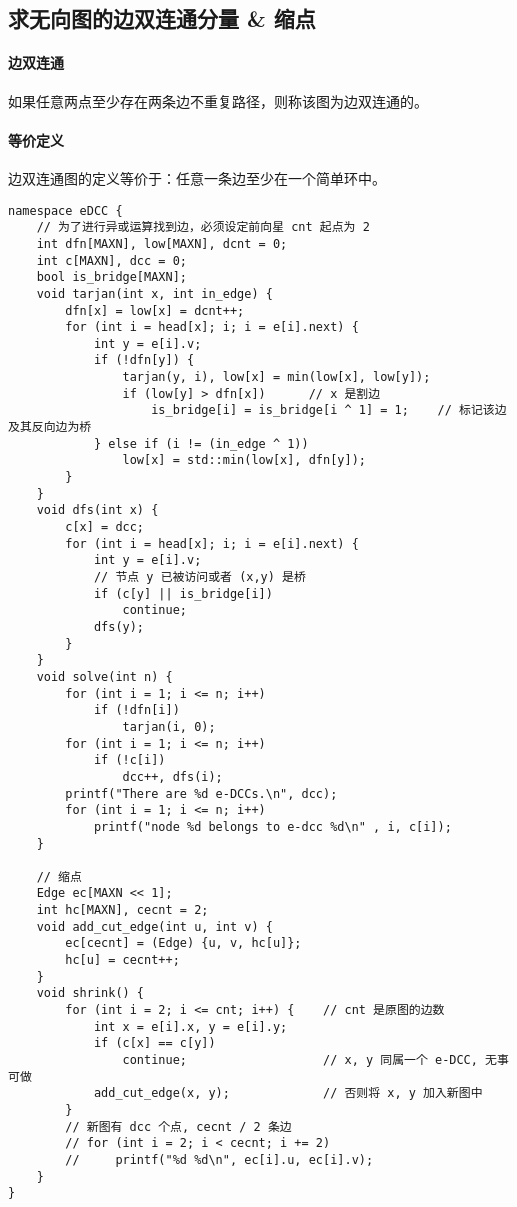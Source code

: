 \subsection{求无向图的边双连通分量 \& 缩点}
\paragraph{边双连通} 如果任意两点至少存在两条边不重复路径，则称该图为边双连通的。
\paragraph{等价定义} 边双连通图的定义等价于：任意一条边至少在一个简单环中。
\begin{verbatim}
namespace eDCC {
    // 为了进行异或运算找到边，必须设定前向星 cnt 起点为 2 
    int dfn[MAXN], low[MAXN], dcnt = 0;
    int c[MAXN], dcc = 0;
    bool is_bridge[MAXN];
    void tarjan(int x, int in_edge) {
        dfn[x] = low[x] = dcnt++;
        for (int i = head[x]; i; i = e[i].next) {
            int y = e[i].v;
            if (!dfn[y]) {
                tarjan(y, i), low[x] = min(low[x], low[y]);
                if (low[y] > dfn[x])      // x 是割边 
                    is_bridge[i] = is_bridge[i ^ 1] = 1;    // 标记该边及其反向边为桥 
            } else if (i != (in_edge ^ 1))
                low[x] = std::min(low[x], dfn[y]);
        }
    }
    void dfs(int x) {
        c[x] = dcc;
        for (int i = head[x]; i; i = e[i].next) {
            int y = e[i].v;
            // 节点 y 已被访问或者 (x,y) 是桥 
            if (c[y] || is_bridge[i])
                continue;
            dfs(y);
        }
    }
    void solve(int n) {
        for (int i = 1; i <= n; i++)
            if (!dfn[i])
                tarjan(i, 0);
        for (int i = 1; i <= n; i++)
            if (!c[i])
                dcc++, dfs(i);
        printf("There are %d e-DCCs.\n", dcc);
        for (int i = 1; i <= n; i++)
            printf("node %d belongs to e-dcc %d\n" , i, c[i]);
    }

    // 缩点
    Edge ec[MAXN << 1];
    int hc[MAXN], cecnt = 2;
    void add_cut_edge(int u, int v) {
        ec[cecnt] = (Edge) {u, v, hc[u]};
        hc[u] = cecnt++;
    }
    void shrink() {
        for (int i = 2; i <= cnt; i++) {    // cnt 是原图的边数
            int x = e[i].x, y = e[i].y;
            if (c[x] == c[y])
                continue;                   // x, y 同属一个 e-DCC, 无事可做
            add_cut_edge(x, y);             // 否则将 x, y 加入新图中
        }
        // 新图有 dcc 个点, cecnt / 2 条边
        // for (int i = 2; i < cecnt; i += 2)
        //     printf("%d %d\n", ec[i].u, ec[i].v);
    }    
}    
\end{verbatim}

